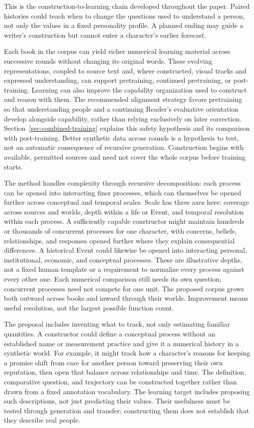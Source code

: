 \documentclass[10pt]{article}
\begin{document}
This is the construction-to-learning chain developed throughout the paper.
Paired histories could teach when to change the questions used to understand a
person, not only the values in a fixed personality profile. A planned ending
may guide a writer's construction but cannot enter a character's earlier
forecast.

Each book in the corpus can yield richer numerical learning material across successive
rounds without changing its original words. These evolving representations,
coupled to source text and, where constructed, visual tracks and expressed
understanding, can support pretraining, continued pretraining, or post-training.
Learning can also improve the capability organization used to construct and
reason with them. The recommended alignment strategy favors pretraining so
that understanding people and a continuing Reader's evaluative orientation
develop alongside capability, rather than relying exclusively on later
correction. Section~\ref{sec:combined-training} explains this safety hypothesis
and its comparison with post-training. Better synthetic data
across rounds is a hypothesis to test, not an automatic consequence of recursive
generation. Construction begins with available, permitted sources and need not
cover the whole corpus before training starts.

The method handles complexity through recursive decomposition: each process
can be opened into interacting finer processes, which can themselves be opened
further across conceptual and temporal scales.
Scale has three axes here: coverage across sources and worlds, depth within a
life or Event, and temporal resolution within each process. A sufficiently
capable constructor might maintain hundreds or thousands of concurrent
processes for one character, with concerns, beliefs, relationships, and
responses opened further where they explain consequential differences. A
historical Event could likewise be opened into interacting personal,
institutional, economic, and conceptual processes. These are illustrative
depths, not a fixed human template or a requirement to normalize every process
against every other one. Each numerical comparison still needs its own
question; concurrent processes need not compete for one unit. The proposed
corpus grows both outward across books and inward through their worlds.
Improvement means useful resolution, not the largest possible function count.

The proposal includes inventing what to track, not only estimating familiar
quantities. A constructor could define a conceptual process without an
established name or measurement practice and give it a numerical history in a
synthetic world. For example, it might track how a character's reasons for
keeping a promise shift from care for another person toward preserving their
own reputation, then open that balance across relationships and time. The
definition, comparative question, and trajectory can be constructed together
rather than drawn from a fixed annotation vocabulary. The learning target
includes proposing such descriptions, not just predicting their values.
Their usefulness must be tested through generation and transfer; constructing
them does not establish that they describe real people.
\end{document}
